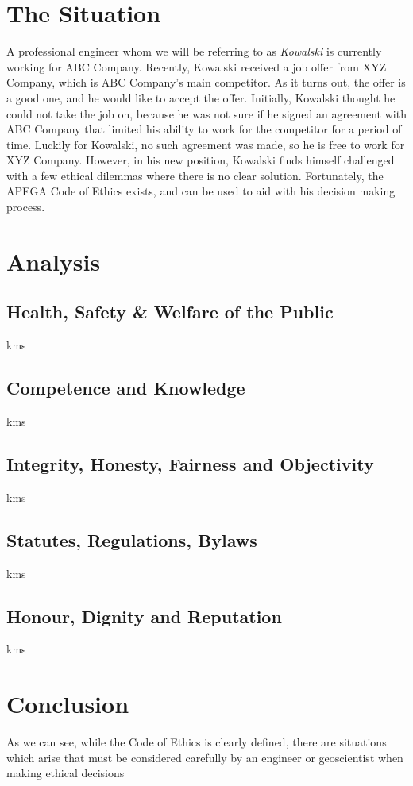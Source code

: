 \documentclass[letterpaper,12pt]{article}
\begin{document}
\section{The Situation}
A professional engineer whom we will be referring to as \textit{Kowalski} is currently working for ABC Company.
Recently, Kowalski received a job offer from XYZ Company, which is ABC Company's main competitor. As it turns out,
the offer is a good one, and he would like to accept the offer. Initially, Kowalski thought he could not take 
the job on, because he was not sure if he signed an agreement with ABC Company that limited his ability to work for the
competitor for a period of time. Luckily for Kowalski, no such agreement was made, so he is free to work for XYZ Company.
However, in his new position, Kowalski finds himself challenged with a few ethical dilemmas where there is no clear solution.
Fortunately, the APEGA Code of Ethics exists, and can be used to aid with his decision making process. 


\section{Analysis}

\subsection{Health, Safety \& Welfare of the Public}
kms

\subsection{Competence and Knowledge}
kms

\subsection{Integrity, Honesty, Fairness and Objectivity}
kms

\subsection{Statutes, Regulations, Bylaws}
kms

\subsection{Honour, Dignity and Reputation}
kms

\section{Conclusion}
As we can see, while the Code of Ethics is clearly defined, there are situations which arise that must be considered carefully by an engineer or
geoscientist when making ethical decisions


\singlespacing
\nocite{*}
\printbibliography
\end{document}
